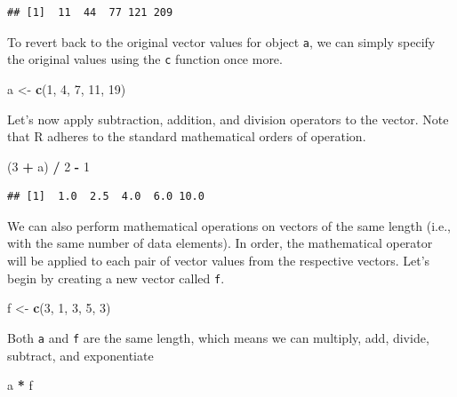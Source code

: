 \documentclass[]{book}
\newenvironment{Shaded}{\begin{snugshade}}{\end{snugshade}}
\newcommand{\KeywordTok}[1]{\textcolor[rgb]{0.13,0.29,0.53}{\textbf{#1}}}
\newcommand{\DecValTok}[1]{\textcolor[rgb]{0.00,0.00,0.81}{#1}}
\newcommand{\StringTok}[1]{\textcolor[rgb]{0.31,0.60,0.02}{#1}}
\newcommand{\OperatorTok}[1]{\textcolor[rgb]{0.81,0.36,0.00}{\textbf{#1}}}
\newcommand{\NormalTok}[1]{#1}
\begin{document}
\begin{verbatim}
## [1]  11  44  77 121 209
\end{verbatim}

To revert back to the original vector values for object \texttt{a}, we
can simply specify the original values using the \texttt{c} function
once more.

\begin{Shaded}
\begin{Highlighting}[]
\NormalTok{a <-}\StringTok{ }\KeywordTok{c}\NormalTok{(}\DecValTok{1}\NormalTok{, }\DecValTok{4}\NormalTok{, }\DecValTok{7}\NormalTok{, }\DecValTok{11}\NormalTok{, }\DecValTok{19}\NormalTok{)}
\end{Highlighting}
\end{Shaded}

Let's now apply subtraction, addition, and division operators to the
vector. Note that R adheres to the standard mathematical orders of
operation.

\begin{Shaded}
\begin{Highlighting}[]
\NormalTok{(}\DecValTok{3} \OperatorTok{+}\StringTok{ }\NormalTok{a) }\OperatorTok{/}\StringTok{ }\DecValTok{2} \OperatorTok{-}\StringTok{ }\DecValTok{1}
\end{Highlighting}
\end{Shaded}

\begin{verbatim}
## [1]  1.0  2.5  4.0  6.0 10.0
\end{verbatim}

We can also perform mathematical operations on vectors of the same
length (i.e., with the same number of data elements). In order, the
mathematical operator will be applied to each pair of vector values from
the respective vectors. Let's begin by creating a new vector called
\texttt{f}.

\begin{Shaded}
\begin{Highlighting}[]
\NormalTok{f <-}\StringTok{ }\KeywordTok{c}\NormalTok{(}\DecValTok{3}\NormalTok{, }\DecValTok{1}\NormalTok{, }\DecValTok{3}\NormalTok{, }\DecValTok{5}\NormalTok{, }\DecValTok{3}\NormalTok{)}
\end{Highlighting}
\end{Shaded}

Both \texttt{a} and \texttt{f} are the same length, which means we can
multiply, add, divide, subtract, and exponentiate

\begin{Shaded}
\begin{Highlighting}[]
\NormalTok{a }\OperatorTok{*}\StringTok{ }\NormalTok{f}
\end{Highlighting}
\end{Shaded}
\end{document}
